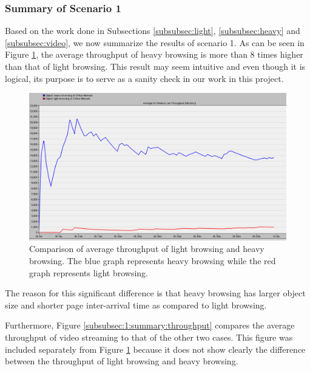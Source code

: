 \subsubsection{Summary of Scenario 1} \label{subsubsec:1:summary}
Based on the work done in Subsections \ref{subsubsec:light}, \ref{subsubsec:heavy} and \ref{subsubsec:video}, we now summarize the results of scenario 1. As can be seen in Figure \ref{subsubsec:1:summary:through}, the average throughput of heavy browsing is more than 8 times higher than that of light browsing. This result may seem intuitive and even though it is logical, its purpose is to serve as a sanity check in our work in this project. 

\begin{figure}[H]
	\centering
	\includegraphics[scale=0.35]{Figures/amantianrenamed/ScenarioAveragelightheavybrowsing.png}
	\caption[Scenario 1: comparison of average throughput]{Comparison of average throughput of light browsing and heavy browsing. The blue graph represents heavy browsing while the red graph represents light browsing.}
	\label{subsubsec:1:summary:through}
\end{figure}

The reason for this significant difference is that heavy browsing has larger object size and shorter page inter-arrival time as compared to light browsing.

Furthermore, Figure \ref{subsubsec:1:summary:throughput} compares the average throughput of video streaming to that of the other two cases. This figure was included separately from Figure \ref{subsubsec:1:summary:through} because it does not show clearly the difference between the throughput of light browsing and heavy browsing.

